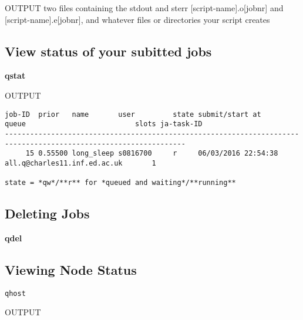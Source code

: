 \documentclass[]{article}
\newenvironment{Shaded}{\begin{snugshade}}{\end{snugshade}}
\newcommand{\KeywordTok}[1]{\textcolor[rgb]{0.13,0.29,0.53}{\textbf{{#1}}}}
\begin{document}
OUTPUT two files containing the stdout and sterr
{[}script-name{]}.o{[}jobnr{]} and {[}script-name{]}.e{[}jobnr{]}, and
whatever files or directories your script creates

\subsection{View status of your subitted
jobs}\label{view-status-of-your-subitted-jobs}

\begin{Shaded}
\begin{Highlighting}[]
\KeywordTok{qstat}
\end{Highlighting}
\end{Shaded}

OUTPUT

\begin{verbatim}
job-ID  prior   name       user         state submit/start at     queue                          slots ja-task-ID 
-----------------------------------------------------------------------------------------------------------------
     15 0.55500 long_sleep s0816700     r     06/03/2016 22:54:38 all.q@charles11.inf.ed.ac.uk       1 

state = *qw*/**r** for *queued and waiting*/**running**
\end{verbatim}

\subsection{Deleting Jobs}\label{deleting-jobs}

\begin{Shaded}
\begin{Highlighting}[]
\KeywordTok{qdel}
\end{Highlighting}
\end{Shaded}

\subsection{Viewing Node Status}\label{viewing-node-status}

\texttt{qhost}

OUTPUT
\end{document}
